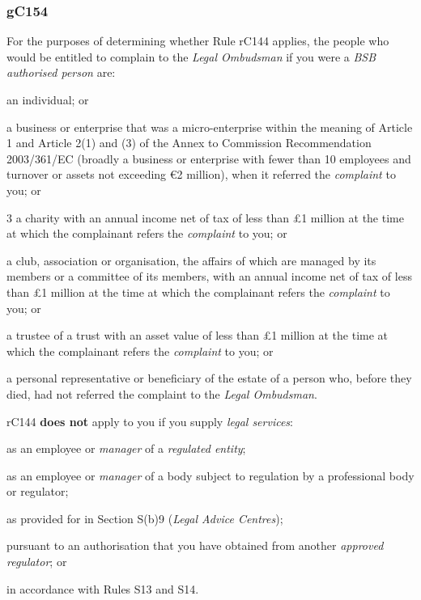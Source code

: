 \subsubsection{\color{darkgrey}gC154}

For the purposes of determining whether Rule rC144 applies, the people
who would be entitled to complain to the \emph{Legal Ombudsman} if you
were a \emph{BSB authorised person} are:
\begin{numlist}\item an individual; or
\item a business or enterprise that was a micro-enterprise within the
meaning of Article 1 and Article 2(1) and (3) of the Annex to Commission
Recommendation 2003/361/EC (broadly a business or enterprise with fewer
than 10 employees and turnover or assets not exceeding €2 million), when
it referred the \emph{complaint} to you; or

3 a charity with an annual income net of tax of less than £1 million at
the time at which the complainant refers the \emph{complaint} to you; or
\item a club, association or organisation, the affairs of which are managed
by its members or a committee of its members, with an annual income net
of tax of less than £1 million at the time at which the complainant
refers the \emph{complaint} to you; or
\item a trustee of a trust with an asset value of less than £1 million at
the time at which the complainant refers the \emph{complaint} to you; or
\item a personal representative or beneficiary of the estate of a person
who, before they died, had not referred the complaint to the \emph{Legal
Ombudsman}.\end{numlist}



rC144 \textcolor{myred}{\textbf{does not}} apply to you if you supply \emph{legal services}:
\begin{numlist}\item as an employee or \emph{manager} of a \emph{regulated entity};
\item as an employee or \emph{manager} of a body subject to regulation by a
professional body or regulator;
\item as provided for in Section S(b)9 (\emph{Legal Advice Centres});
\item pursuant to an authorisation that you have obtained from another
\emph{approved regulator}; or
\item in accordance with Rules S13 and S14.

\end{numlist}


